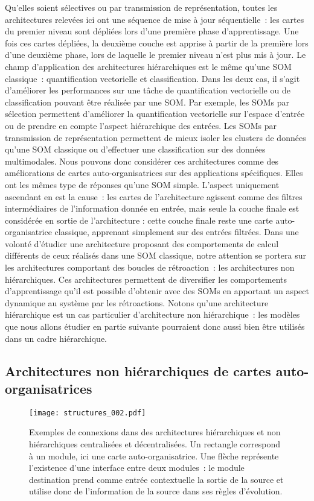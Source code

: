 \documentclass[../main]{subfiles}
\begin{document}
Qu'elles soient sélectives ou par transmission de représentation, toutes les architectures relevées ici ont une séquence de mise à jour séquentielle~: les cartes du premier niveau sont dépliées lors d'une première phase d'apprentissage. Une fois ces cartes dépliées, la deuxième couche est apprise à partir de la première lors d'une deuxième phase, lors de laquelle le premier niveau n'est plus mis à jour.
Le champ d'application des architectures hiérarchiques est le même qu'une SOM classique~: quantification vectorielle et classification.
Dans les deux cas, il s'agit d'améliorer les performances sur une tâche de quantification vectorielle ou de classification pouvant être réalisée par une SOM. 
Par exemple, les SOMs par sélection permettent d'améliorer la quantification vectorielle sur l'espace d'entrée ou de prendre en compte l'aspect hiérarchique des entrées. Les SOMs par transmission de représentation permettent de mieux isoler les clusters de données qu'une SOM classique ou d'effectuer une classification sur des données multimodales.
Nous pouvons donc considérer ces architectures comme des améliorations de cartes auto-organisatrices sur des applications spécifiques.
Elles ont les mêmes type de réponses qu'une SOM simple.
L'aspect uniquement ascendant en est la cause~: les cartes de l'architecture agissent comme des filtres intermédiaires de l'information donnée en entrée, mais seule la couche finale est considérée en sortie de l'architecture : cette couche finale reste une carte auto-organisatrice classique, apprenant simplement sur des entrées filtrées.
Dans une volonté d'étudier une architecture proposant des comportements de calcul différents de ceux réalisés dans une SOM classique, notre attention se portera sur les architectures comportant des boucles de rétroaction~: les architectures non hiérarchiques.
Ces architectures permettent de diversifier les comportements d'apprentissage qu'il est possible d'obtenir avec des SOMs en apportant un aspect dynamique au système par les rétroactions. 
Notons qu'une architecture hiérarchique est un cas particulier d'architecture non hiérarchique~: les modèles que nous allons étudier en partie suivante pourraient donc aussi bien être utilisés dans un cadre hiérarchique.


\subsection{Architectures non hiérarchiques de cartes auto-organisatrices}

\begin{figure}
    \centering\texttt{[image: structures\_002.pdf]}
    \caption{Exemples de connexions dans des architectures hiérarchiques et non hiérarchiques centralisées et décentralisées. Un rectangle correspond à un module, ici une carte auto-organisatrice. Une flèche représente l'existence d'une interface entre deux modules~: le module destination prend comme entrée contextuelle la sortie de la source et utilise donc de l'information de la source dans ses règles d'évolution. \label{fig:structure}}
    \end{figure}
\end{document}
